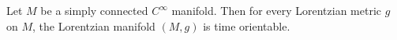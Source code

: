 Let $M$ be a simply connected $C^\infty$ manifold. Then for every Lorentzian metric $g$ on $M$, the Lorentzian manifold $(M, g)$ is time orientable.
